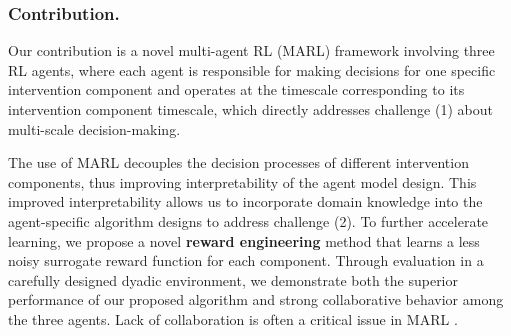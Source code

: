


\subsubsection{Contribution.} Our contribution is a novel  multi-agent RL (MARL) framework involving three RL agents, where each agent is responsible for making decisions for one specific intervention component and operates at the timescale corresponding to its intervention component timescale, which directly addresses challenge (1) about multi-scale decision-making.

The use of MARL decouples the decision processes of different intervention components, thus  improving  interpretability of the agent model design. This improved interpretability allows us to incorporate domain knowledge into the agent-specific algorithm designs to address challenge (2). To further accelerate learning, we propose a novel \textbf{reward engineering} method that learns a less noisy surrogate reward function for each component. Through evaluation in a carefully designed dyadic environment, we demonstrate both the superior performance of our proposed algorithm and strong collaborative behavior among the three agents. Lack of collaboration is often a critical issue in MARL \cite{oroojlooy2023review}.






